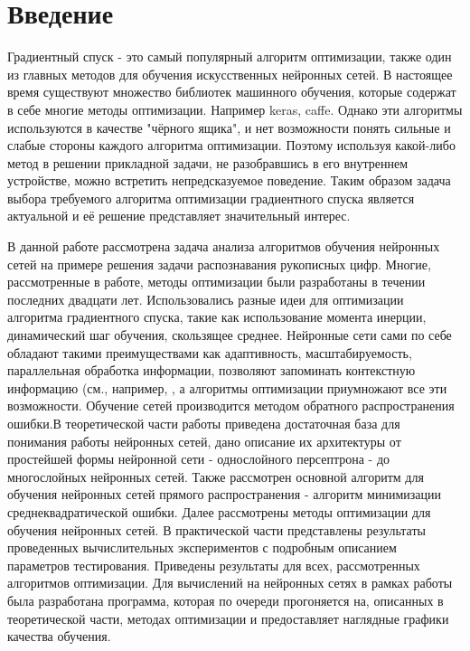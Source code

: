 \documentclass[oneside,final,14pt]{extreport}
\newcommand{\tocsecindent}{\hspace{7mm}}
\begin{document}
\tableofcontents

\chapter*{Введение}
\addcontentsline{toc}{chapter}{\tocsecindent{Введение}}
Градиентный спуск - это самый популярный алгоритм оптимизации, также один из главных методов для обучения искусственных нейронных сетей. В настоящее время существуют множество библиотек машинного обучения, которые содержат в себе многие методы оптимизации. Например keras\cite{bib:keras}, caffe\cite{bib:caffe}. Однако эти алгоритмы используются в качестве "чёрного ящика", и нет возможности понять сильные и слабые стороны каждого алгоритма оптимизации. Поэтому используя какой-либо метод в решении прикладной задачи, не разобравшись в его внутреннем устройстве, можно встретить непредсказуемое поведение. Таким образом задача выбора требуемого алгоритма оптимизации градиентного спуска является актуальной и её решение представляет значительный интерес.

В данной работе рассмотрена задача анализа алгоритмов обучения нейронных сетей на примере решения задачи распознавания рукописных цифр. Многие, рассмотренные в работе, методы оптимизации были разработаны в течении последних двадцати лет. Использовались разные идеи для оптимизации алгоритма градиентного спуска, такие как использование момента инерции, динамический шаг обучения, скользящее среднее. Нейронные сети сами по себе обладают такими преимуществами как адаптивность, масштабируемость, параллельная обработка информации, позволяют запоминать контекстную информацию (см., например, \cite[стр.~33]{hykin:nn}, а алгоритмы оптимизации приумножают все эти возможности. Обучение сетей производится методом обратного распространения ошибки.В теоретической части работы приведена достаточная база для понимания работы нейронных сетей, дано описание их архитектуры от простейшей формы нейронной сети - однослойного персептрона - до многослойных нейронных сетей. Также рассмотрен основной алгоритм для обучения нейронных сетей прямого распространения - алгоритм минимизации среднеквадратической ошибки. Далее рассмотрены методы оптимизации для обучения нейронных сетей. В практической части представлены результаты проведенных вычислительных экспериментов с подробным описанием параметров тестирования. Приведены результаты для всех, рассмотренных алгоритмов оптимизации. Для вычислений на нейронных сетях в рамках работы была разработана программа, которая по очереди прогоняется на, описанных в теоретической части, методах оптимизации и предоставляет наглядные графики качества обучения.
\end{document}
